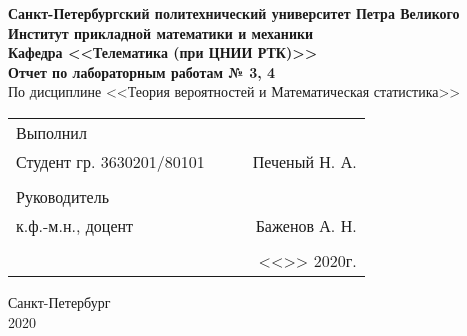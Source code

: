 \documentclass[12pt]{article}
\begin{document}
\begin{titlepage}
	\begin{center}
		\hfill \break
		{\textbf{Санкт-Петербургский политехнический университет Петра Великого}}\\
		\hfill \break
		\textbf{Институт прикладной математики и механики}\\
		 \hfill \break
		\textbf{Кафедра <<Телематика (при ЦНИИ РТК)>>}\\
		\vfill
		\large{\bfseries Отчет по лабораторным работам № 3, 4}\\
		\hfill \break
		\hfill \break
		\hfill \break
		\hfill \break
		По дисциплине <<Теория вероятностей и Математическая статистика>>\\
		\hfill \break
		\hfill \break
		\hfill \break
	\end{center}
 
	\normalsize
	{ 
		\begin{tabular}{lp{2cm}cr}
			Выполнил &&&\\
			Студент гр. 3630201/80101&&\underline{\hspace{1.5cm}}& Печеный Н. А.\\\\
			Руководитель&&&\\ 
			к.ф.-м.н., доцент && \underline{\hspace{1.5cm}}& Баженов А. Н. \\\\
			&&&<<\underline{\phantom{333}}>>\underline{\phantom{сентября000}}
			2020г.
		\end{tabular}
	}
\vfill

\begin{center} Санкт-Петербург \\2020 \end{center}
\end{titlepage}

\newpage

\setcounter{page}{2}

\setlength{\parindent}{1cm}

\tableofcontents

\newpage

\listoffigures

\newpage

\listoftables

\newpage
\end{document}

